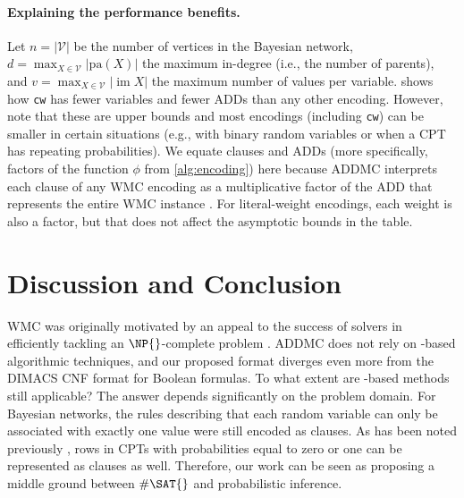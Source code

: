 \documentclass{article}
\DeclareMathOperator{\im}{im}
\begin{document}
\paragraph{Explaining the performance benefits.} Let $n = |\mathcal{V}|$ be the
number of vertices in the Bayesian network, $d = \max_{X \in \mathcal{V}}
|\mathrm{pa}(X)|$ the maximum in-degree (i.e., the number of parents), and $v =
\max_{X \in \mathcal{V}} |\im X|$ the maximum number of values per variable.
 shows how \texttt{cw} has fewer variables and fewer
ADDs than any other encoding. However, note that these are upper bounds and most
encodings (including \texttt{cw}) can be smaller in certain situations (e.g.,
with binary random variables or when a CPT has repeating probabilities). We
equate clauses and ADDs (more specifically, factors of the function $\phi$ from
\cref{alg:encoding}) here because ADDMC interprets each clause of any WMC
encoding as a multiplicative factor of the ADD that represents the entire WMC
instance \cite{DBLP:conf/aaai/DudekPV20}. For literal-weight encodings, each
weight is also a factor, but that does not affect the asymptotic bounds in the
table.


\section{Discussion and Conclusion}

WMC was originally motivated by an appeal to the success of \SAT{} solvers in
efficiently tackling an $\NP{}$-complete problem \cite{DBLP:conf/aaai/SangBK05}.
ADDMC does not rely on \SAT{}-based algorithmic techniques, and our proposed
format diverges even more from the DIMACS CNF format for Boolean formulas. To
what extent are \SAT{}-based methods still applicable? The answer depends
significantly on the problem domain. For Bayesian networks, the rules describing
that each random variable can only be associated with exactly one value were
still encoded as clauses. As has been noted previously
\cite{DBLP:conf/sat/ChaviraD06}, rows in CPTs with probabilities equal to zero
or one can be represented as clauses as well. Therefore, our work can be seen as
proposing a middle ground between $\#\SAT{}$ and probabilistic inference.
\end{document}
